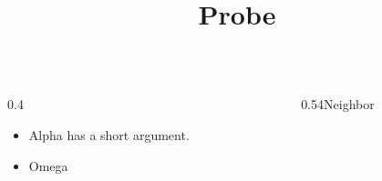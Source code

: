 \documentclass[10pt,aspectratio=169]{beamer}
\title{Probe}
\date{}
\begin{document}
\begin{frame}\begin{columns}[onlytextwidth,T]\begin{column}{0.4\textwidth}\begin{itemize}\item Alpha has a short argument.\par {}\item Omega\end{itemize}\end{column}\begin{column}{0.54\textwidth}Neighbor\end{column}\end{columns}\end{frame}
\end{document}

